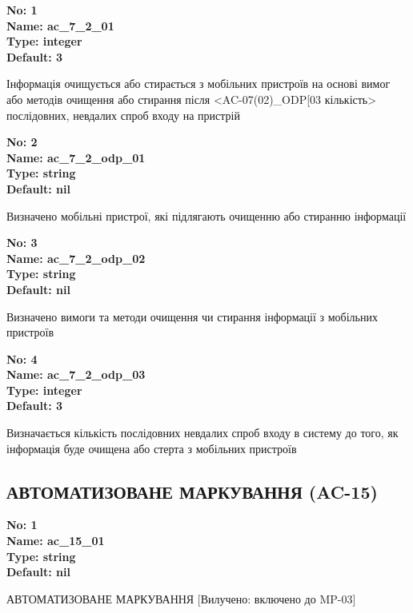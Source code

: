 \documentclass{article}
\begin{document}
\vspace{10pt}
{\footnotesize\bfseries
No: 1\\
Name: ac\_\allowbreak{}7\_\allowbreak{}2\_\allowbreak{}01\\
Type: integer\\
Default: 3
}

{\footnotesize Інформація очищується або стирається з мобільних пристроїв на основі вимог або методів очищення або стирання після <AC-07(02)\_\allowbreak{}ODP[03 кількість> послідовних, невдалих спроб входу на пристрій}


{\footnotesize\bfseries
No: 2\\
Name: ac\_\allowbreak{}7\_\allowbreak{}2\_\allowbreak{}odp\_\allowbreak{}01\\
Type: string\\
Default: nil
}

{\footnotesize Визначено мобільні пристрої, які підлягають очищенню або стиранню інформації}


{\footnotesize\bfseries
No: 3\\
Name: ac\_\allowbreak{}7\_\allowbreak{}2\_\allowbreak{}odp\_\allowbreak{}02\\
Type: string\\
Default: nil
}

{\footnotesize Визначено вимоги та методи очищення чи стирання інформації з мобільних пристроїв}


{\footnotesize\bfseries
No: 4\\
Name: ac\_\allowbreak{}7\_\allowbreak{}2\_\allowbreak{}odp\_\allowbreak{}03\\
Type: integer\\
Default: 3
}

{\footnotesize Визначається кількість послідовних невдалих спроб входу в систему до того, як інформація буде очищена або стерта з мобільних пристроїв}




\subsection{АВТОМАТИЗОВАНЕ МАРКУВАННЯ (AC-15)}


\vspace{10pt}
{\footnotesize\bfseries
No: 1\\
Name: ac\_\allowbreak{}15\_\allowbreak{}01\\
Type: string\\
Default: nil
}

{\footnotesize АВТОМАТИЗОВАНЕ МАРКУВАННЯ [Вилучено: включено до MP-03]}
\end{document}
